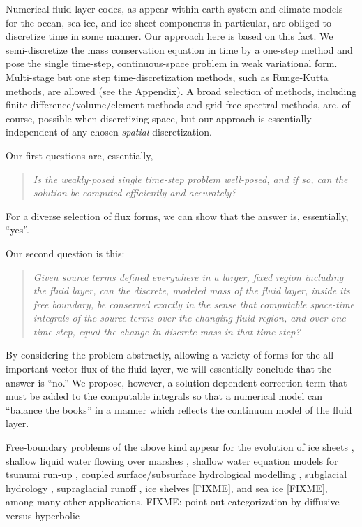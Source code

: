 \documentclass[final,leqno,onefignum,onetabnum]{siamltex1213bueler}
\begin{document}
Numerical fluid layer codes, as appear within earth-system and climate models for the ocean, sea-ice, and ice sheet components in particular, are obliged to discretize time in some manner.  Our approach here is based on this fact.  We semi-discretize the mass conservation equation in time by a one-step method and pose the single time-step, continuous-space problem in weak variational form.  Multi-stage but one step time-discretization methods, such as Runge-Kutta methods, are allowed (see the Appendix).  A broad selection of methods, including finite difference/volume/element methods and grid free spectral methods, are, of course, possible when discretizing space, but our approach is essentially independent of any chosen \emph{spatial} discretization.

Our first questions are, essentially,
  \begin{quote}
  \emph{Is the weakly-posed single time-step problem well-posed, and if so, can the solution be computed efficiently and accurately?}
  \end{quote}
For a diverse selection of flux forms, we can show that the answer is, essentially, ``yes''.

Our second question is this:
  \begin{quote}
  \emph{Given source terms defined everywhere in a larger, fixed region including the fluid layer, can the discrete, modeled mass of the fluid layer, inside its free boundary, be conserved exactly in the sense that computable space-time integrals of the source terms over the changing fluid region, and over one time step, equal the change in discrete mass in that time step?}
  \end{quote}
By considering the problem abstractly, allowing a variety of forms for the all-important vector flux of the fluid layer, we will essentially conclude that the answer is ``no.''  We propose, however, a solution-dependent correction term that must be added to the computable integrals so that a numerical model can ``balance the books'' in a manner which reflects the continuum model of the fluid layer.

Free-boundary problems of the above kind appear for the evolution of ice sheets \cite{BLKCB,CDDSV,EgholmNielsen2010,JouvetBueler2012}, shallow liquid water flowing over marshes \cite{AlonsoSantillanaDawson}, shallow water equation models for tsunumi run-up \cite{LeVequeGeorge2008}, coupled surface/subsurface hydrological modelling \cite{Maxwelletal2014}, subglacial hydrology \cite{AschwandenBuelerKhroulevBlatter,BuelervanPeltDRAFT,Schoofetal2012}, supraglacial runoff \cite{AschwandenBuelerKhroulevBlatter}, ice shelves [FIXME], and sea ice [FIXME], among many other applications.  FIXME: point out categorization by diffusive versus hyperbolic
\end{document}
